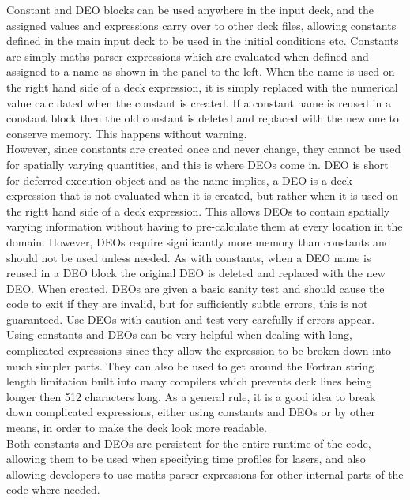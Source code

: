 \documentclass[12pt,a4paper]{article}
\begin{document}
Constant and DEO blocks can be used anywhere in the input deck, and the
assigned values and expressions carry over to other deck files, allowing
constants defined in the main input deck to be used in the initial conditions
etc. Constants are simply maths parser expressions which are evaluated when
defined and assigned to a name as shown in the panel to the left. When the name
is used on the right hand side of a deck expression, it is simply replaced with
the numerical value calculated when the constant is created.  If a constant
name is reused in a constant block then the old constant is deleted and
replaced with the new one to conserve memory. This happens without warning.\\

However, since constants are created once and never change, they cannot be used
for spatially varying quantities, and this is where DEOs come in. DEO is short
for deferred execution object and as the name implies, a DEO is a deck
expression that is not evaluated when it is created, but rather when it is used
on the right hand side of a deck expression. This allows DEOs to contain
spatially varying information without having to pre-calculate them at every
location in the domain. However, DEOs require significantly more memory than
constants and should not be used unless needed. As with constants, when a DEO
name is reused in a DEO block the original DEO is deleted and replaced with the
new DEO. When created, DEOs are given a basic sanity test and should cause the
code to exit if they are invalid, but for sufficiently subtle errors, this is
not guaranteed. Use DEOs with caution and test very carefully if errors
appear.\\

Using constants and DEOs can be very helpful when dealing with long,
complicated expressions since they allow the expression to be broken down into
much simpler parts. They can also be used to get around the Fortran string
length limitation built into many compilers which prevents deck lines being
longer then 512 characters long. As a general rule, it is a good idea to break
down complicated expressions, either using constants and DEOs or by other
means, in order to make the deck look more readable.\\

Both constants and DEOs are persistent for the entire runtime of the code,
allowing them to be used when specifying time profiles for lasers, and also
allowing developers to use maths parser expressions for other internal parts of
the code where needed.
\end{document}
